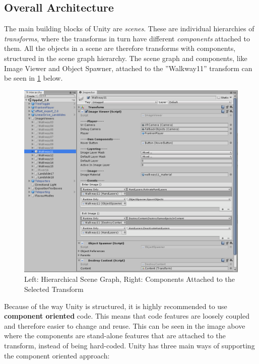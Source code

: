     \subsection{Overall Architecture}
        The main building blocks of Unity are \textit{scenes}. These are individual hierarchies of \textit{transforms}, where the transforms in turn have different \textit{components} attached to them. All the objects in a scene are therefore transforms with components, structured in the scene graph hierarchy. The scene graph and components, like Image Viewer and Object Spawner, attached to the ''Walkway11'' transform can be seen in \cref{fig:unity} below.
        
        \FloatBarrier
        \begin{figure}
            \centering
            \includegraphics[width=\ImageWidth]{figures/unity.PNG}
            \caption{Left: Hierarchical Scene Graph, Right: Components Attached to the Selected Transform}
            \label{fig:unity}
        \end{figure}
        \FloatBarrier
        
        Because of the way Unity is structured, it is highly recommended to use \textbf{component oriented} code. This means that code features are loosely coupled and therefore easier to change and reuse. This can be seen in the image above where the components are stand-alone features that are attached to the transform, instead of being hard-coded. Unity has three main ways of supporting the component oriented approach:
        
